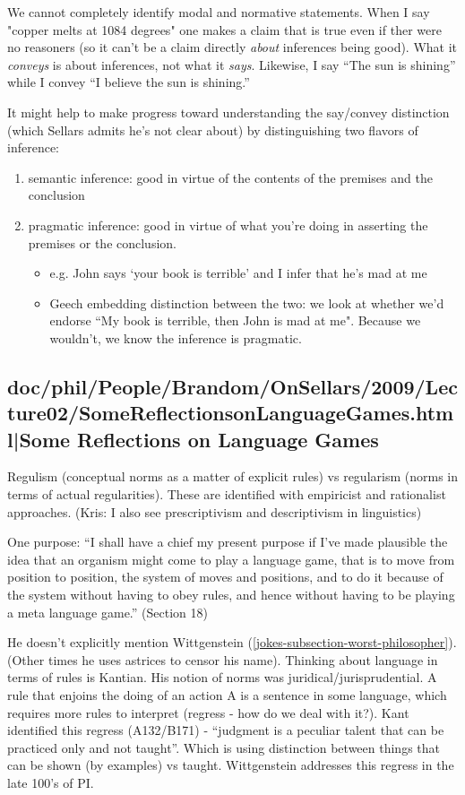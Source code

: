 \documentclass[12pt,a4paper]{report}
\begin{document}
We cannot completely identify modal and normative statements. When I say "copper melts at 1084 degrees" one makes a claim that is true even if ther were no reasoners (so it can't be a claim directly \emph{about} inferences being good). What it \emph{conveys} is about inferences, not what it \emph{says}. Likewise, I say ``The sun is shining'' while I convey ``I believe the sun is shining.''

It might help to make progress toward understanding the say/convey distinction (which Sellars admits he's not clear about) by distinguishing two flavors of inference:
\begin{enumerate}
\item semantic inference: good in virtue of the contents of the premises and the conclusion
\item pragmatic inference: good in virtue of what you're doing in asserting the premises or the conclusion.
 \begin{itemize}
 \item e.g. John says `your book is terrible' and I infer that he's mad at me
 \item Geech embedding distinction between the two: we look at whether we'd endorse ``My book is terrible, then John is mad at me". Because we wouldn't, we know the inference is pragmatic.

 \end{itemize}
\end{enumerate}
\subsection{doc/phil/People/Brandom/OnSellars/2009/Lecture02/SomeReflectionsonLanguageGames.html|Some Reflections on Language Games}

Regulism (conceptual norms as a matter of explicit rules) vs regularism (norms in terms of actual regularities). These are identified with empiricist and rationalist approaches. (Kris: I also see prescriptivism and descriptivism in linguistics)

One purpose: ``I shall have a chief my present purpose if I've made plausible the idea that an organism might come to play a language game, that is to move from position to position, the system of moves and positions, and to do it because of the system without having to obey rules, and hence without having to be playing a meta language game.'' (Section 18)

He doesn't explicitly mention Wittgenstein (\ref{jokes-subsection-worst-philosopher}). (Other times he uses astrices to censor his name). Thinking about language in terms of rules is Kantian. His notion of norms was juridical/jurisprudential. A rule that enjoins the doing of an action A is a sentence in some language, which requires more rules to interpret (regress - how do we deal with it?). Kant identified this regress (A132/B171) - ``judgment is a peculiar talent that can be practiced only and not taught''. Which is using distinction between things that can be shown (by examples) vs taught. Wittgenstein addresses this regress in the late 100's of PI.
\end{document}
